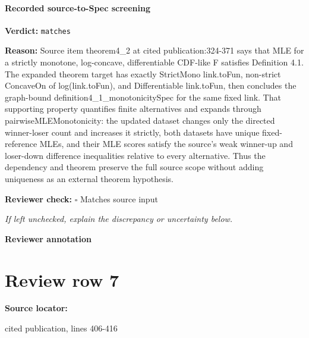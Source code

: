 \documentclass[10pt]{article}
\newcommand{\reviewerbox}{%
  \par\noindent\fbox{\parbox{0.96\linewidth}{\rule{0pt}{0.38in}}}\par
}
\newcommand{\reviewmatch}[1]{%
  \par\noindent\textbf{Reviewer check:} $\square$\; #1\par
  \noindent\emph{If left unchecked, explain the discrepancy or uncertainty below.}\par
}
\begin{document}
\paragraph{Recorded source-to-Spec screening}
\textbf{Verdict:} \texttt{matches}
\\
{\raggedright
\textbf{Reason:} Source item theorem4\_\allowbreak{}2 at cited publication:\allowbreak{}324-\allowbreak{}371 says that MLE for a strictly monotone, log-\allowbreak{}concave, differentiable CDF-\allowbreak{}like F satisfies Definition 4.\allowbreak{}1.\allowbreak{} The expanded theorem target has exactly StrictMono link.\allowbreak{}toFun, non-\allowbreak{}strict ConcaveOn of log(link.\allowbreak{}toFun), and Differentiable link.\allowbreak{}toFun, then concludes the graph-\allowbreak{}bound definition4\_\allowbreak{}1\_\allowbreak{}monotonicitySpec for the same fixed link.\allowbreak{} That supporting property quantifies finite alternatives and expands through pairwiseMLEMonotonicity:\allowbreak{} the updated dataset changes only the directed winner-\allowbreak{}loser count and increases it strictly, both datasets have unique fixed-\allowbreak{}reference MLEs, and their MLE scores satisfy the source's weak winner-\allowbreak{}up and loser-\allowbreak{}down difference inequalities relative to every alternative.\allowbreak{} Thus the dependency and theorem preserve the full source scope without adding uniqueness as an external theorem hypothesis.\allowbreak{}
\par}
\reviewmatch{Matches source input}
\noindent\textbf{Reviewer annotation}\par
\reviewerbox
\clearpage
\hypertarget{source-claim-ce5587b5543267f3}{}
\section*{Review row 7}
\textbf{Source locator:} {\footnotesize\raggedright cited publication, lines 406-\allowbreak{}416\par}
\end{document}
